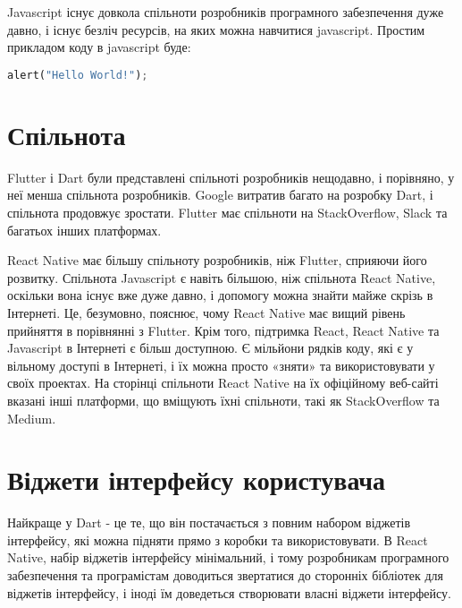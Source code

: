 Javascript існує довкола спільноти розробників програмного забезпечення дуже давно, і існує безліч ресурсів, на яких можна навчитися javascript.
Простим прикладом коду в javascript буде:

\begin{lstlisting}[style=light, language=Python,label={lst:vectorimg},caption=Dart Hello World]
  alert("Hello World!");
\end{lstlisting}


\section{Спільнота}\label{section.1.6}

Flutter і Dart були представлені спільноті розробників нещодавно, і порівняно, у неї менша спільнота розробників.
Google витратив багато на розробку Dart, і спільнота продовжує зростати.
Flutter має спільноти на StackOverflow, Slack та багатьох інших платформах.

React Native має більшу спільноту розробників, ніж Flutter, сприяючи його розвитку.
Спільнота Javascript є навіть більшою, ніж спільнота React Native, оскільки вона існує вже дуже давно, і допомогу можна знайти майже скрізь в Інтернеті.
Це, безумовно, пояснює, чому React Native має вищий рівень прийняття в порівнянні з Flutter.
Крім того, підтримка React, React Native та Javascript в Інтернеті є більш доступною.
Є мільйони рядків коду, які є у вільному доступі в Інтернеті, і їх можна просто «зняти» та використовувати у своїх проектах.
На сторінці спільноти React Native на їх офіційному веб-сайті вказані інші платформи, що вміщують їхні спільноти, такі як StackOverflow та Medium.


\section{Віджети інтерфейсу користувача}\label{section.1.7}
Найкраще у Dart - це те, що він постачається з повним набором віджетів інтерфейсу, які можна підняти прямо з коробки та використовувати.
В React Native, набір віджетів інтерфейсу мінімальний, і тому розробникам програмного забезпечення та програмістам доводиться звертатися до сторонніх бібліотек для віджетів інтерфейсу, і іноді їм доведеться створювати власні віджети інтерфейсу. 
